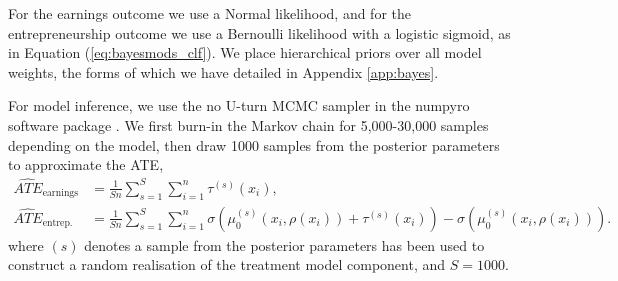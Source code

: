 \documentclass[12pt, a4paper]{article}
\begin{document}
For the earnings outcome we use a Normal likelihood, and for the
entrepreneurship outcome we use a Bernoulli likelihood with a logistic sigmoid,
as in Equation (\ref{eq:bayesmods_clf}). We place hierarchical priors over all
model weights, the forms of which we have detailed in Appendix \ref{app:bayes}.

For model inference, we use the no U-turn MCMC sampler \citep{hoffman2014} in
the numpyro software package \citep{bingham2019, phan2019}. We first burn-in
the Markov chain for 5,000-30,000 samples depending on the model, then draw 1000
samples from the posterior parameters to approximate the ATE,
\begin{align}
  \hat{ATE}_\text{earnings} &= \frac{1}{Sn} \sum^S_{s=1} \sum^n_{i=1} \tau^{(s)}(x_i), 
  \label{eq:hlrATE} \\
  \hat{ATE}_\text{entrep.} &= \frac{1}{Sn} \sum^S_{s=1} \sum^n_{i=1} 
    \sigma\left(\mu_0^{(s)}(x_i, \rho(x_i)) + \tau^{(s)}(x_i)\right)
    - \sigma\left(\mu_0^{(s)}(x_i, \rho(x_i))\right).
  \label{eq:hlcATE}
\end{align}
where $(s)$ denotes a sample from the posterior parameters has been used to 
construct a random realisation of the treatment model component, and $S = 1000$.
\end{document}
